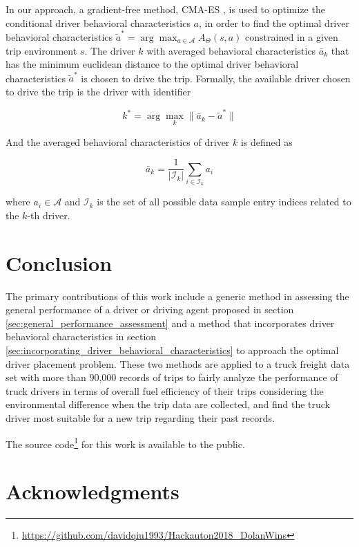 \documentclass{article}
\begin{document}
In our approach, a gradient-free method, CMA-ES \cite{hansen2001completely}, is used to optimize the conditional driver behavioral characteristics $ a $, in order to find the optimal driver behavioral characteristics $ \tilde{a}^{*} = \arg\max_{a \in \mathcal{A}} A_{\Theta}(s, a) $ constrained in a given trip environment $ s $. The driver $ k $ with averaged behavioral characteristics $\bar{a}_{k} $ that has the minimum euclidean distance to the optimal driver behavioral characteristics $ \tilde{a}^{*} $ is chosen to drive the trip. Formally, the available driver chosen to drive the trip is the driver with identifier

\[
k^{*} = \arg\max_{k} \| \bar{a}_{k} - \tilde{a}^{*} \|
\]

And the averaged behavioral characteristics of driver $ k $ is defined as

\[
\bar{a}_{k} = \frac{1}{ | \mathcal{I}_{k} | } \sum_{i \in \mathcal{I}_{k}} a_{i}
\]

where $ a_{i} \in \mathcal{A} $ and $ \mathcal{I}_{k} $ is the set of all possible data sample entry indices related to the $k$-th driver.


\section{Conclusion}\label{sec:conclusion}

The primary contributions of this work include a generic method in assessing the general performance of a driver or driving agent proposed in section \ref{sec:general_performance_assessment} and a method that incorporates driver behavioral characteristics in section \ref{sec:incorporating_driver_behavioral_characteristics} to approach the optimal driver placement problem. These two methods are applied to a truck freight data set with more than 90,000 records of trips to fairly analyze the performance of truck drivers in terms of overall fuel efficiency of their trips considering the environmental difference when the trip data are collected, and find the truck driver most suitable for a new trip regarding their past records.

The source code\footnote{\url{https://github.com/davidqiu1993/Hackauton2018_DolanWins}} for this work is available to the public.


\section*{Acknowledgments}
\end{document}
